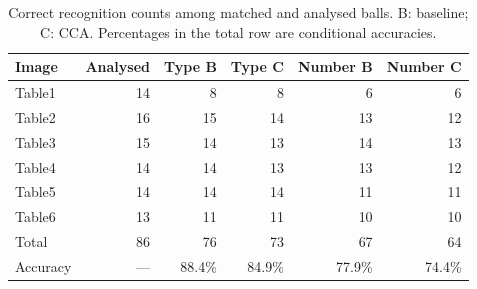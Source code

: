 \begin{table}[htbp]
\centering
\small
\caption{Correct recognition counts among matched and analysed balls. B: baseline; C: CCA. Percentages in the total row are conditional accuracies.}
\label{tab:recognition}
\begin{tabular}{lrrrrr}
\toprule
Image & Analysed & Type B & Type C & Number B & Number C \\
\midrule
Table1 & 14 & 8 & 8 & 6 & 6 \\
Table2 & 16 & 15 & 14 & 13 & 12 \\
Table3 & 15 & 14 & 13 & 14 & 13 \\
Table4 & 14 & 14 & 13 & 13 & 12 \\
Table5 & 14 & 14 & 14 & 11 & 11 \\
Table6 & 13 & 11 & 11 & 10 & 10 \\
\midrule
Total & 86 & 76 & 73 & 67 & 64 \\
Accuracy & --- & 88.4\% & 84.9\% & 77.9\% & 74.4\% \\
\bottomrule
\end{tabular}
\end{table}
